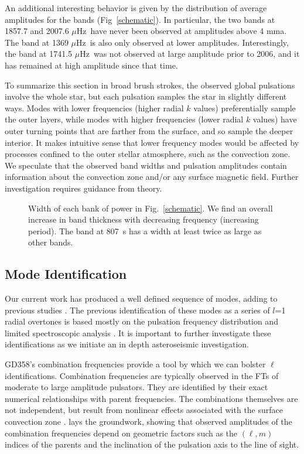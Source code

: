 \documentclass[12pt,preprint]{aastex}
\newcommand{\muHz}{\mbox{$\mu$Hz}}
\begin{document}
An additional interesting behavior is given by the distribution of average amplitudes for the bands 
(Fig~\ref{schematic}). In particular, the two bands at 1857.7 and 2007.6  \muHz\ have never been observed 
at amplitudes above 4 mma. The band at 1369 \muHz\ is also only observed at lower amplitudes. Interestingly, 
the band at 1741.5 \muHz\ was not observed at large amplitude prior to 2006, and it has remained at high 
amplitude since that time. 

To summarize this section in broad brush strokes, the observed global pulsations involve the whole star, 
but each pulsation samples the star in slightly different ways.  Modes with lower frequencies 
(higher radial $k$ values) preferentially sample the outer layers, while modes with higher frequencies 
(lower radial $k$ values) have outer turning points that are farther from the surface, and so sample the 
deeper interior. It makes intuitive sense that lower frequency modes would be affected by processes 
confined to the outer stellar atmosphere, such as the convection zone. We speculate that the 
observed band widths and pulsation amplitudes contain information about the convection zone and/or any surface
magnetic field. Further investigation requires guidance from theory.  


\begin{figure}
 \caption{Width of each bank of power in Fig.~\ref{schematic}. We find an overall increase 
 in band thickness with decreasing frequency (increasing period).  The band at 807~s has a width
 at least twice as large as other bands.  
 \label{thick}}
\end{figure}


\subsection{Mode Identification}\label{mode}
Our current work has produced a well defined sequence of modes, adding to 
previous studies \citep{Montgomery10, Provencal09, Metcalfe00, Winget94}. The previous 
identification of these modes as a series of $l$=1 radial overtones is based mostly on 
the pulsation frequency distribution and limited spectroscopic analysis 
\citep{Kotak02, Castanheira05}. It is important to further investigate these identifications 
as we initiate an in depth asteroseismic investigation.  

GD358's combination frequencies provide a tool by which we can bolster $\ell$ identifications. 
Combination frequencies are typically observed in the FTs of moderate to large amplitude pulsators.  
They are identified by their exact numerical relationships with parent frequencies.  
The combinations themselves are not independent, but result from nonlinear effects associated 
with the surface convection zone \citep{Brickhill92, Brassard95, Wu01, Ising01}.  
\citet{Wu01} lays the groundwork, showing that observed amplitudes of the combination 
frequencies depend on geometric factors such as the $(\ell,m)$ indices of the parents and the 
inclination of the pulsation axis to the line of sight.  
\end{document}
